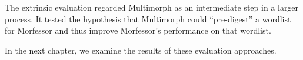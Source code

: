 {The extrinsic evaluation regarded Multimorph as an intermediate step in a larger process. It tested the hypothesis that Multimorph could ``pre-digest'' a wordlist for Morfessor and thus improve Morfessor's performance on that
wordlist.

In the next chapter, we examine the results of these evaluation approaches.


%
}
